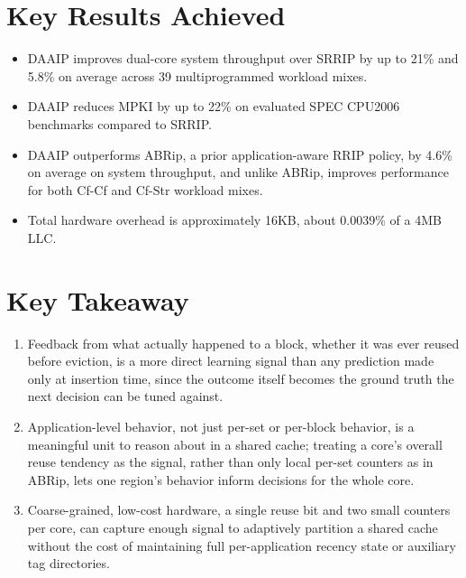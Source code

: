 \documentclass[10pt, conference]{IEEEtran}
\begin{document}
\section{Key Results Achieved}
\begin{itemize}[leftmargin=*, itemsep=0pt, topsep=1pt, parsep=0pt]
    \item DAAIP improves dual-core system throughput over SRRIP by up to 21\% and 5.8\% on average across 39 multiprogrammed workload mixes.
    \item DAAIP reduces MPKI by up to 22\% on evaluated SPEC CPU2006 benchmarks compared to SRRIP.
    \item DAAIP outperforms ABRip, a prior application-aware RRIP policy, by 4.6\% on average on system throughput, and unlike ABRip, improves performance for both Cf-Cf and Cf-Str workload mixes.
    \item Total hardware overhead is approximately 16KB, about 0.0039\% of a 4MB LLC.
\end{itemize}

\section{Key Takeaway}
\begin{enumerate}[leftmargin=*, itemsep=0pt, topsep=1pt, parsep=0pt]
    \item Feedback from what actually happened to a block, whether it was ever reused before eviction, is a more direct learning signal than any prediction made only at insertion time, since the outcome itself becomes the ground truth the next decision can be tuned against.
    \item Application-level behavior, not just per-set or per-block behavior, is a meaningful unit to reason about in a shared cache; treating a core's overall reuse tendency as the signal, rather than only local per-set counters as in ABRip, lets one region's behavior inform decisions for the whole core.
    \item Coarse-grained, low-cost hardware, a single reuse bit and two small counters per core, can capture enough signal to adaptively partition a shared cache without the cost of maintaining full per-application recency state or auxiliary tag directories.
\end{enumerate}
\end{document}
